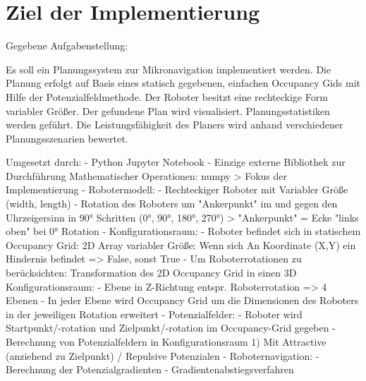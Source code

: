 \chapter{Ziel der Implementierung}

Gegebene Aufgabenstellung:

Es soll ein Planungssystem zur Mikronavigation implementiert werden. Die
Planung erfolgt auf Basis eines statisch gegebenen, einfachen Occupancy Gids
mit Hilfe der Potenzialfeldmethode. Der Roboter besitzt eine rechteckige Form
variabler Größer. Der gefundene Plan wird visualisiert. Planungsstatistiken
werden geführt. Die Leistungsfähigkeit des Planers wird anhand verschiedener
Planungsszenarien bewertet.

Umgesetzt durch:
- Python Jupyter Notebook
- Einzige externe Bibliothek zur Durchführung Mathematischer Operationen: numpy
> Fokus der Implementierung
	- Robotermodell: 
		- Rechteckiger Roboter mit Variabler Größe (width, length)
		- Rotation des Roboters um "Ankerpunkt" im und gegen den Uhrzeigersinn in 90° Schritten (0°, 90°, 180°, 270°) 
			> "Ankerpunkt" = Ecke "links oben" bei 0° Rotation
	- Konfigurationsraum:
		- Roboter befindet sich in statischem Occupancy Grid: 2D Array variabler Größe: Wenn sich An Koordinate (X,Y) ein Hindernis befindet => False, sonst True
		- Um Roboterrotationen zu berücksichten: Transformation des 2D Occupancy Grid in einen 3D Konfigurationsraum:
		- Ebene in Z-Richtung entspr. Roboterrotation => 4 Ebenen
		- In jeder Ebene wird Occupancy Grid um die Dimensionen des Roboters in der jeweiligen Rotation erweitert
	- Potenzialfelder:
		- Roboter wird Startpunkt/-rotation und Zielpunkt/-rotation im Occupancy-Grid gegeben
		- Berechnung von Potenzialfeldern in Konfigurationsraum 1) Mit Attractive (anziehend zu Zielpunkt) / Repulsive Potenzialen
	- Roboternavigation:
		- Berechnung der Potenzialgradienten
		- Gradientenabstiegsverfahren
